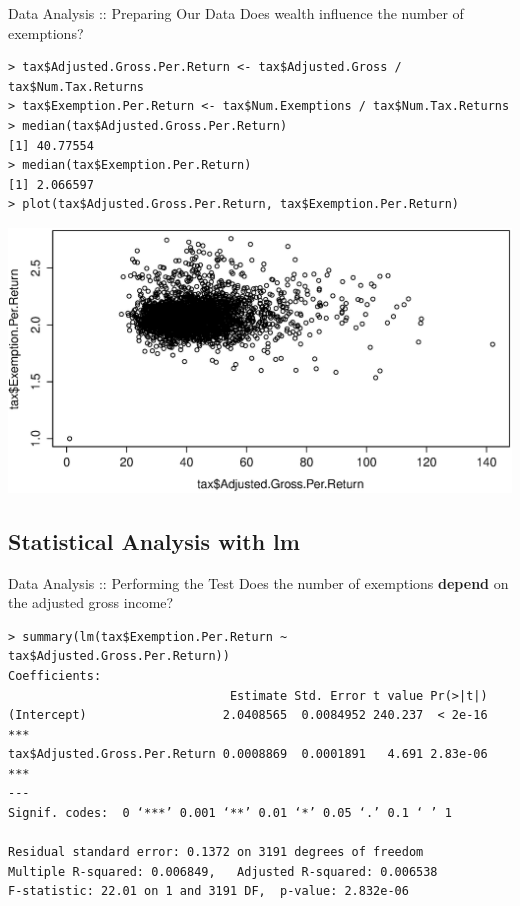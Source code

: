 \documentclass{beamer}
\begin{document}
\begin{frame}[fragile]{Data Analysis :: Preparing Our Data}
Does wealth influence the number of exemptions?

\begin{footnotesize}
\begin{verbatim}
> tax$Adjusted.Gross.Per.Return <- tax$Adjusted.Gross / tax$Num.Tax.Returns
> tax$Exemption.Per.Return <- tax$Num.Exemptions / tax$Num.Tax.Returns
> median(tax$Adjusted.Gross.Per.Return)
[1] 40.77554
> median(tax$Exemption.Per.Return)
[1] 2.066597
> plot(tax$Adjusted.Gross.Per.Return, tax$Exemption.Per.Return)
\end{verbatim}
\end{footnotesize}

\includegraphics[scale=0.2]{income_v_exemptions.eps}

\end{frame}

\subsection{Statistical Analysis with lm}

\begin{frame}[fragile]{Data Analysis :: Performing the Test}
Does the number of exemptions \textbf{depend} on the adjusted gross income?

\begin{footnotesize}
\begin{verbatim}
> summary(lm(tax$Exemption.Per.Return ~ tax$Adjusted.Gross.Per.Return))
Coefficients:
                               Estimate Std. Error t value Pr(>|t|)    
(Intercept)                   2.0408565  0.0084952 240.237  < 2e-16 ***
tax$Adjusted.Gross.Per.Return 0.0008869  0.0001891   4.691 2.83e-06 ***
---
Signif. codes:  0 ‘***’ 0.001 ‘**’ 0.01 ‘*’ 0.05 ‘.’ 0.1 ‘ ’ 1 

Residual standard error: 0.1372 on 3191 degrees of freedom
Multiple R-squared: 0.006849,   Adjusted R-squared: 0.006538 
F-statistic: 22.01 on 1 and 3191 DF,  p-value: 2.832e-06
\end{verbatim}
\end{footnotesize}

\end{frame}
\end{document}
